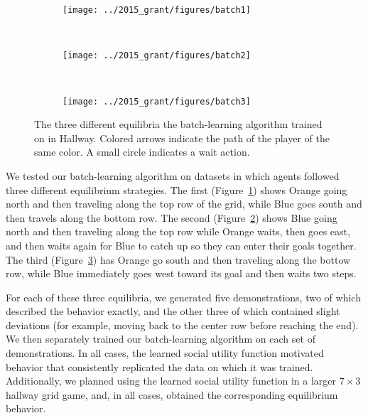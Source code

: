 
\begin{figure}
    \centering
    \begin{subfigure}[b]{0.275\textwidth}
        \texttt{[image: ../2015\_grant/figures/batch1]}
        \caption{}
        \label{fig:batch1}
    \end{subfigure}
\qquad
    ~ %
    \begin{subfigure}[b]{0.275\textwidth}
        \texttt{[image: ../2015\_grant/figures/batch2]}
        \caption{}
        \label{fig:batch2}
    \end{subfigure}
\qquad
    ~ %
    \begin{subfigure}[b]{0.275\textwidth}
        \texttt{[image: ../2015\_grant/figures/batch3]}
        \caption{}
        \label{fig:batch3}
    \end{subfigure}
    \caption{The three different equilibria the batch-learning algorithm trained on in Hallway. Colored arrows indicate the path of the player of the same color. A small circle indicates a wait action.}\label{fig:batchRes}
\end{figure}

We tested our batch-learning algorithm on datasets in which
agents followed three different equilibrium strategies. 
The first (Figure~\ref{fig:batch1}) shows Orange going north and then
traveling along the top row of the grid, while Blue goes south and
then travels along the bottom row. The second
(Figure~\ref{fig:batch2}) shows Blue going north and then traveling
along the top row while Orange waits, then goes east, and then waits
again for Blue to catch up so they can enter their goals together.
The third (Figure~\ref{fig:batch3}) has Orange go south and then
traveling along the bottow row, while Blue immediately goes west
toward its goal and then waits two steps.

For each of these three equilibria, we generated five demonstrations,
two of which described the behavior exactly, and the other three of
which contained slight deviations (for example, moving back to the
center row before reaching the end). We then separately trained our
batch-learning algorithm on each set of demonstrations. In all cases, the
learned social utility function motivated behavior that consistently
replicated the data on which it was trained. Additionally, we planned
using the learned social utility function in a larger $7\times 3$ hallway grid
game, and, in all cases, obtained the corresponding equilibrium behavior.

